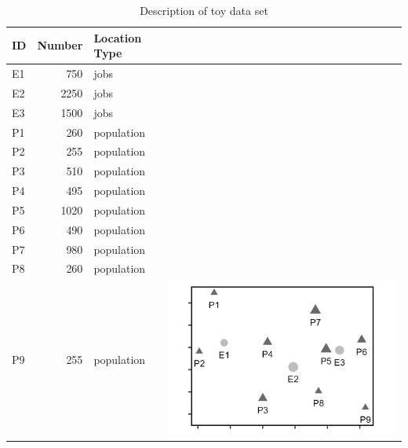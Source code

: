 \documentclass[]{elsarticle} %
\begin{document}
\begin{table}

\caption{\label{tab:toy-example-table}\label{tab:toy-example}Description of toy data set}
\centering
\begin{tabular}[t]{lrl>{}l}
\toprule
ID & Number & Location Type &  \\
\midrule
E1 & 750 & jobs & \\

E2 & 2250 & jobs & \\

E3 & 1500 & jobs & \\

P1 & 260 & population & \\

P2 & 255 & population & \\

P3 & 510 & population & \\

P4 & 495 & population & \\

P5 & 1020 & population & \\

P6 & 490 & population & \\

P7 & 980 & population & \\

P8 & 260 & population & \\

P9 & 255 & population & \multirow{-12}{*}{\raggedright\arraybackslash \includegraphics{images/figure-1.png}}\\
\bottomrule
\end{tabular}
\end{table}
\end{document}
